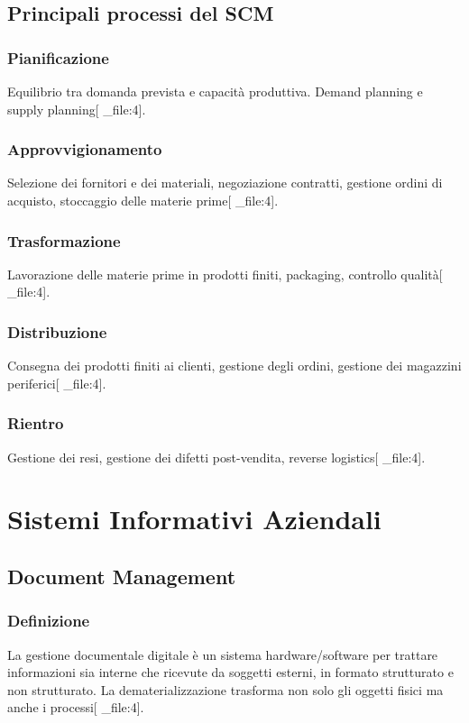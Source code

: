 \documentclass[12pt,a4paper]{article}
\begin{document}
\subsection{Principali processi del SCM}

\subsubsection{Pianificazione}
Equilibrio tra domanda prevista e capacità produttiva. Demand planning e supply planning[ _file:4].

\subsubsection{Approvvigionamento}
Selezione dei fornitori e dei materiali, negoziazione contratti, gestione ordini di acquisto, stoccaggio delle materie prime[ _file:4].

\subsubsection{Trasformazione}
Lavorazione delle materie prime in prodotti finiti, packaging, controllo qualità[ _file:4].

\subsubsection{Distribuzione}
Consegna dei prodotti finiti ai clienti, gestione degli ordini, gestione dei magazzini periferici[ _file:4].

\subsubsection{Rientro}
Gestione dei resi, gestione dei difetti post-vendita, reverse logistics[ _file:4].

\section{Sistemi Informativi Aziendali}

\subsection{Document Management}

\subsubsection{Definizione}
La gestione documentale digitale è un sistema hardware/software per trattare informazioni sia interne che ricevute da soggetti esterni, in formato strutturato e non strutturato. La dematerializzazione trasforma non solo gli oggetti fisici ma anche i processi[ _file:4].
\end{document}
